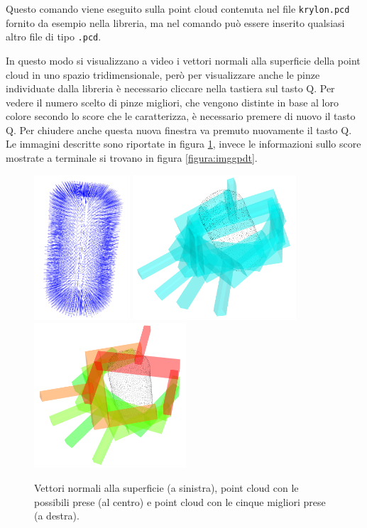 \documentclass{report}
\begin{document}
Questo comando viene eseguito sulla point cloud contenuta nel file \texttt{krylon.pcd} fornito da esempio nella libreria, ma nel comando può essere inserito qualsiasi altro file di tipo \texttt{.pcd}. \par
In questo modo si visualizzano a video i vettori normali alla superficie della point cloud in uno spazio tridimensionale, però per visualizzare anche le pinze individuate dalla libreria è necessario cliccare nella tastiera sul tasto Q. Per vedere il numero scelto di pinze migliori, che  vengono distinte in base al loro colore secondo lo score che le caratterizza, è necessario premere di nuovo il tasto Q. Per chiudere anche questa nuova finestra va premuto nuovamente il tasto Q. Le immagini descritte sono riportate in figura \ref{figura:imggpd}, invece le informazioni sullo score mostrate a terminale si trovano in figura \ref{figura:imggpdt}.
\begin{figure}[h!]
	\centering
	\includegraphics[height=5.4cm]{immagini/gpd1}
	\includegraphics[height=5.4cm]{immagini/gpd2}
	\includegraphics[height=5.4cm]{immagini/gpd3}
	\caption{Vettori normali alla superficie (a sinistra), point cloud con le possibili prese (al centro) e point cloud con le cinque migliori prese (a destra).}
	\label{figura:imggpd}
\end{figure}
\end{document}
